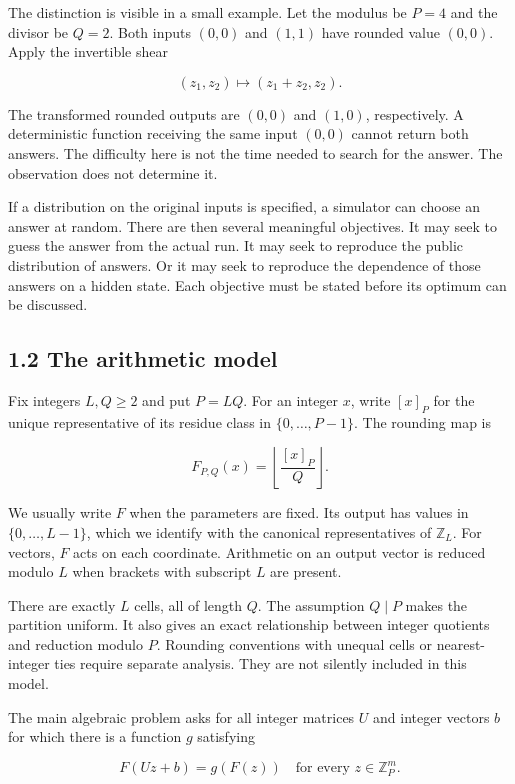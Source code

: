 \documentclass[
]{article}
\begin{document}
The distinction is visible in a small example. Let the modulus be
\(P=4\) and the divisor be \(Q=2\). Both inputs \((0,0)\) and \((1,1)\)
have rounded value \((0,0)\). Apply the invertible shear

\[
(z_1,z_2)\longmapsto(z_1+z_2,z_2).
\]

The transformed rounded outputs are \((0,0)\) and \((1,0)\),
respectively. A deterministic function receiving the same input
\((0,0)\) cannot return both answers. The difficulty here is not the
time needed to search for the answer. The observation does not determine
it.

If a distribution on the original inputs is specified, a simulator can
choose an answer at random. There are then several meaningful
objectives. It may seek to guess the answer from the actual run. It may
seek to reproduce the public distribution of answers. Or it may seek to
reproduce the dependence of those answers on a hidden state. Each
objective must be stated before its optimum can be discussed.

\subsection{1.2 The arithmetic model}\label{the-arithmetic-model}

Fix integers \(L,Q\ge2\) and put \(P=LQ\). For an integer \(x\), write
\([x]_P\) for the unique representative of its residue class in
\(\{0,\ldots,P-1\}\). The rounding map is

\[
F_{P,Q}(x)=\left\lfloor\frac{[x]_P}{Q}\right\rfloor.
\]

We usually write \(F\) when the parameters are fixed. Its output has
values in \(\{0,\ldots,L-1\}\), which we identify with the canonical
representatives of \(\mathbb Z_L\). For vectors, \(F\) acts on each
coordinate. Arithmetic on an output vector is reduced modulo \(L\) when
brackets with subscript \(L\) are present.

There are exactly \(L\) cells, all of length \(Q\). The assumption
\(Q\mid P\) makes the partition uniform. It also gives an exact
relationship between integer quotients and reduction modulo \(P\).
Rounding conventions with unequal cells or nearest-integer ties require
separate analysis. They are not silently included in this model.

The main algebraic problem asks for all integer matrices \(U\) and
integer vectors \(b\) for which there is a function \(g\) satisfying

\[
F(Uz+b)=g(F(z))\quad\text{for every }z\in\mathbb Z_P^m.
\]
\end{document}
